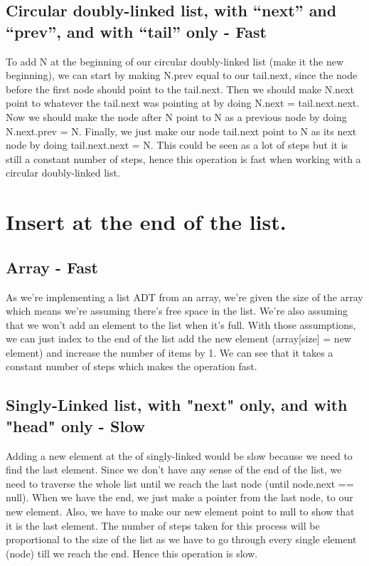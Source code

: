 \documentclass{article}
\begin{document}
\subsection{Circular doubly-linked list, with “next” and “prev”, and with “tail” only - Fast}
To add N at the beginning of our circular doubly-linked list (make it the new beginning), we can start by making N.prev equal to our tail.next, since the node before the first node should point to the tail.next. Then we should make N.next point to whatever the tail.next was pointing at by doing N.next = tail.next.next. Now we should make the node after N point to N as a previous node by doing N.next.prev = N. Finally, we just make our node tail.next point to N as its next node by doing tail.next.next = N. This could be seen as a lot of steps but it is still a constant number of steps, hence this operation is fast when working with a circular doubly-linked list.



\section{Insert at the end of the list.}

\subsection{Array - Fast}
As we're implementing a list ADT from an array, we're given the size of the array which means we're assuming there's free space in the list. We're also assuming that we won't add an element to the list when it's full. With those assumptions, we can just index to the end of the list add the new element (array[size] = new element) and increase the number of items by 1. We can see that it takes a constant number of steps which makes the operation fast.

\subsection{Singly-Linked list, with "next" only, and with "head" only - Slow}
Adding a new element at the of singly-linked would be slow because we need to find the last element. Since we don't have any sense of the end of the list, we need to traverse the whole list until we reach the last node (until node.next == null). When we have the end, we just make a pointer from the last node, to our new element. Also, we have to make our new element point to null to show that it is the last element. The number of steps taken for this process will be proportional to the size of the list as we have to go through every single element (node) till we reach the end. Hence this operation is slow.
\end{document}
